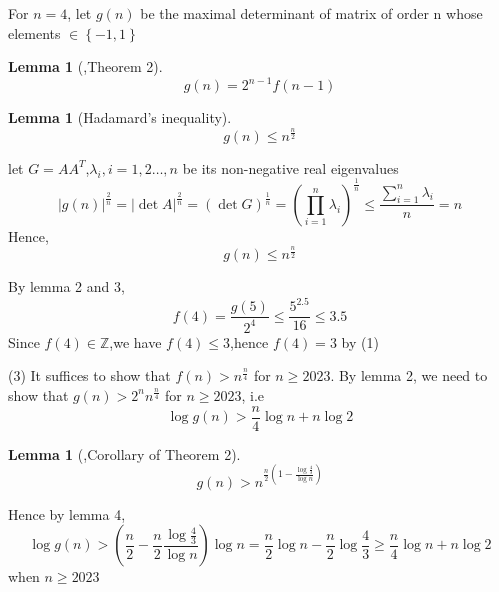 \documentclass[a4paper,12pt]{article}
\newenvironment{prooff}{{\noindent\it\textcolor{cyan!40!black}{Proof}:}\quad}{\par}
\newcommand{\bbrace}[1]{\left\{ #1 \right\} }
\newcommand{\bb}[1]{\mathbb{#1}}
\newtheorem{lem}[defn]{Lemma}
\begin{document}
\begin{prooff}
    For $n=4$, let $g(n)$ be the maximal determinant of matrix of order n whose elements $\in \bbrace{-1,1}$
    \begin{lem}[\cite{10.2307/2034278},Theorem 2]
        \begin{equation*}
            g(n)=2^{n-1}f(n-1)
        \end{equation*}
    \end{lem}
    \begin{lem}[Hadamard’s inequality]
        \begin{equation*}
            g(n)\le n^{\frac{n}{2}}
        \end{equation*}
    \end{lem}
    let $G=AA^T$,$\lambda_i,i=1,2\dots,n$ be its non-negative real eigenvalues
    \begin{equation*}
        |g(n)|^\frac{2}{n}=|\det A|^{\frac{2}{n}}=(\det G)^{\frac{1}{n}}=(\prod_{i=1}^n \lambda_i)^{\frac{1}{n}} \le \frac{ \sum_{i=1}^{n}\lambda_i}{n}=n
    \end{equation*}
    Hence,
    \begin{equation*}
        g(n)\le n^{\frac{n}{2}}
    \end{equation*}

    By lemma 2 and 3,\begin{equation*}
        f(4)=\frac{g(5)}{2^4}\le \frac{5^{2.5}}{16}\le 3.5
    \end{equation*}
    Since $f(4)\in \bb{Z}$,we have $f(4)\le 3$,hence $f(4)=3$ by (1)

    (3)
    It suffices to show that $f(n)>n^{\frac{n}{4}}$ for $n\ge 2023$.
    By lemma 2, we need to show that $g(n)>2^n n^\frac{n}{4}$ for $n\ge 2023$, i.e
    \begin{equation*}
        \log g(n)> \frac{n}{4}\log n+n\log 2
    \end{equation*}
    \begin{lem}[\cite{10.2307/2034695},Corollary of Theorem 2]
        \begin{equation*}
            g(n)>n^{\frac{n}{2}(1-\frac{\log \frac{4}{3}}{\log n}  )}
        \end{equation*}
    \end{lem}
    Hence by lemma 4,
    \begin{equation*}
        \log g(n)>(\frac{n}{2}-\frac{n}{2}\frac{\log \frac{4}{3}}{\log n})\log n=\frac{n}{2}\log n-\frac{n}{2}\log \frac{4}{3}\ge \frac{n}{4}\log n+n\log 2
    \end{equation*}
    when $n\ge 2023$
\end{prooff}
\end{document}

